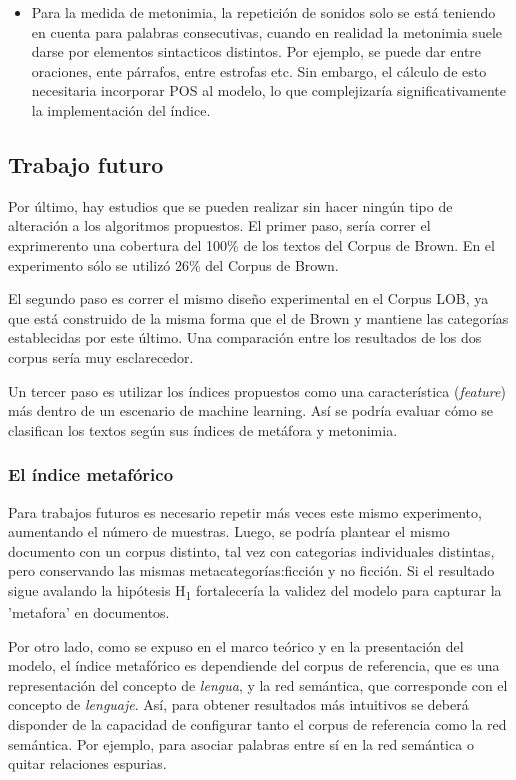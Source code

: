 \documentclass[12pt,letterpaper,twoside]{article}
\begin{document}
\begin{itemize}
\item Para la medida de metonimia, la repetición de sonidos solo se está
teniendo en cuenta para palabras consecutivas, cuando en realidad la
metonimia suele darse por elementos sintacticos distintos. Por
ejemplo, se puede dar entre oraciones, ente párrafos, entre estrofas
etc. Sin embargo, el cálculo de esto necesitaria incorporar POS al
modelo, lo que complejizaría significativamente la implementación
del índice.
\end{itemize}


\subsection{Trabajo futuro}
\label{sec:orga1f46b7}

Por último, hay estudios que se pueden realizar sin hacer ningún
tipo de alteración a los algoritmos propuestos. El primer paso,
sería correr el exprimerento una cobertura del 100\% de los textos
del Corpus de Brown. En el experimento sólo se utilizó 26\% del
Corpus de Brown.

El segundo paso es correr el mismo diseño experimental en el
Corpus LOB, ya que está construido de la misma forma que el de
Brown y mantiene las categorías establecidas por este último. Una
comparación entre los resultados de los dos corpus sería muy
esclarecedor.

Un tercer paso es utilizar los índices propuestos como una
característica (\emph{feature}) más dentro de un escenario de machine
learning. Así se podría evaluar cómo se clasifican los textos
según sus índices de metáfora y metonimia.



\subsubsection{El índice metafórico}
\label{sec:orgbd5b305}
Para trabajos futuros es necesario repetir más veces este mismo experimento, aumentando el número de muestras.
Luego, se podría plantear el mismo documento con un corpus distinto, tal vez con categorias individuales
distintas, pero conservando las mismas metacategorías:ficción y no ficción. Si el resultado sigue
avalando la hipótesis H\textsubscript{1} fortalecería la validez del modelo para capturar la 'metafora' en documentos.

Por otro lado, como se expuso en el marco teórico y en la presentación del modelo, el índice metafórico
es dependiende del corpus de referencia, que es una representación del concepto de \emph{lengua}, y la
red semántica, que corresponde con el concepto de \emph{lenguaje}. Así, para obtener resultados más
intuitivos se deberá disponder de la capacidad de configurar tanto el corpus de referencia como la
red semántica. Por ejemplo, para asociar palabras entre sí en la red semántica o quitar relaciones
espurias.
\end{document}
